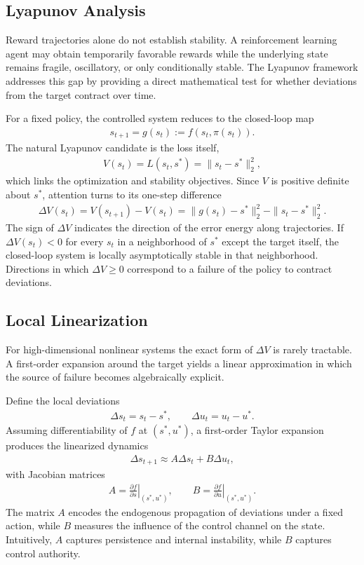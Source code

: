\documentclass[11pt]{article}
\begin{document}
\subsection{Lyapunov Analysis}
Reward trajectories alone do not establish stability. A reinforcement learning agent may obtain temporarily favorable rewards while the underlying state remains fragile, oscillatory, or only conditionally stable. The Lyapunov framework addresses this gap by providing a direct mathematical test for whether deviations from the target contract over time.

For a fixed policy, the controlled system reduces to the closed-loop map
\begin{align*}
    s_{t+1} = g(s_t) := f(s_t,\pi(s_t)).
\end{align*}
The natural Lyapunov candidate is the loss itself,
\begin{align*}
    V(s_t) = L(s_t,s^*) = \|s_t - s^*\|_2^2,
\end{align*}
which links the optimization and stability objectives. Since $V$ is positive definite about $s^*$, attention turns to its one-step difference
\begin{align*}
    \Delta V(s_t) = V(s_{t+1}) - V(s_t) = \|g(s_t)-s^*\|_2^2 - \|s_t-s^*\|_2^2.
\end{align*}
The sign of $\Delta V$ indicates the direction of the error energy along trajectories. If $\Delta V(s_t) < 0$ for every $s_t$ in a neighborhood of $s^*$ except the target itself, the closed-loop system is locally asymptotically stable in that neighborhood. Directions in which $\Delta V \ge 0$ correspond to a failure of the policy to contract deviations.

\subsection{Local Linearization}
For high-dimensional nonlinear systems the exact form of $\Delta V$ is rarely tractable. A first-order expansion around the target yields a linear approximation in which the source of failure becomes algebraically explicit.

Define the local deviations
\begin{align*}
    \Delta s_t = s_t - s^*, \qquad \Delta u_t = u_t - u^*.
\end{align*}
Assuming differentiability of $f$ at $(s^*,u^*)$, a first-order Taylor expansion produces the linearized dynamics
\begin{align}
    \Delta s_{t+1} \approx A \Delta s_t + B \Delta u_t,
\end{align}
with Jacobian matrices
\begin{align*}
    A = \left.\frac{\partial f}{\partial s}\right|_{(s^*,u^*)},
    \qquad
    B = \left.\frac{\partial f}{\partial u}\right|_{(s^*,u^*)}.
\end{align*}
The matrix $A$ encodes the endogenous propagation of deviations under a fixed action, while $B$ measures the influence of the control channel on the state. Intuitively, $A$ captures persistence and internal instability, while $B$ captures control authority.
\end{document}
